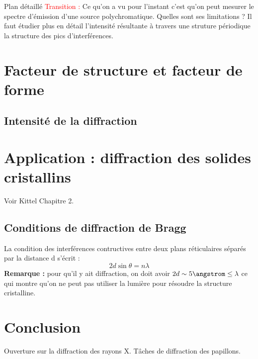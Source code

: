 \begin{reportBlock}{Plan détaillé}
  \textcolor{red}{Transition :} Ce qu'on a vu pour l'instant c'est qu'on peut mesurer le spectre d'émission d'une source polychromatique. Quelles sont ses limitations ? Il faut étudier plus en détail l'intensité résultante à travers une struture périodique la structure des pics d'interférences.

  \section{Facteur de structure et facteur de forme}
  
  \subsection{Intensité de la diffraction}

  \section{Application : diffraction des solides cristallins}
  Voir Kittel Chapitre 2.
  \subsection{Conditions de diffraction de Bragg}
  La condition des interférences contructives entre deux plans réticulaires séparés par la distance d s'écrit :
  \begin{equation}
      2d\sin{\theta} = n\lambda
  \end{equation}
  \textbf{Remarque :} pour qu'il y ait diffraction, on doit avoir $2d\sim 5\angstrom\leq\lambda$ ce qui montre qu'on ne peut pas utiliser la lumière pour résoudre la structure cristalline.


\section*{Conclusion}
Ouverture sur la diffraction des rayons X. Tâches de diffraction des papillons.
\end{reportBlock}



